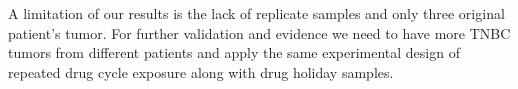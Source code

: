 A limitation of our results is the lack of replicate samples and only three original patient's tumor. For further validation and evidence
we need to have more TNBC tumors from different patients and apply the same experimental design of repeated drug cycle exposure along with drug holiday samples.












